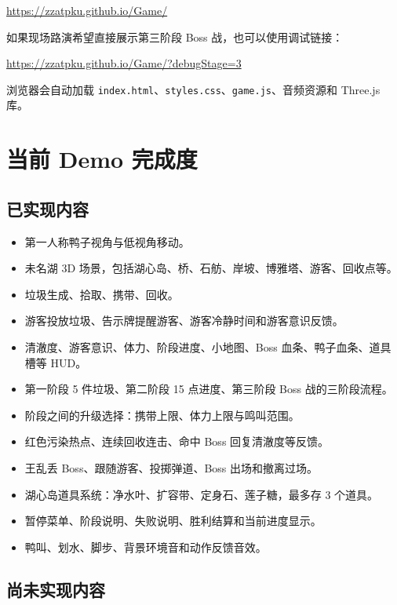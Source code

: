 \documentclass[UTF8,a4paper,12pt]{ctexart}
\begin{document}
\begin{center}
\url{https://zzatpku.github.io/Game/}
\end{center}

如果现场路演希望直接展示第三阶段 Boss 战，也可以使用调试链接：

\begin{center}
\url{https://zzatpku.github.io/Game/?debugStage=3}
\end{center}

浏览器会自动加载 \texttt{index.html}、\texttt{styles.css}、\texttt{game.js}、音频资源和 Three.js 库。

\section{当前 Demo 完成度}

\subsection{已实现内容}

\begin{itemize}
  \item 第一人称鸭子视角与低视角移动。
  \item 未名湖 3D 场景，包括湖心岛、桥、石舫、岸坡、博雅塔、游客、回收点等。
  \item 垃圾生成、拾取、携带、回收。
  \item 游客投放垃圾、告示牌提醒游客、游客冷静时间和游客意识反馈。
  \item 清澈度、游客意识、体力、阶段进度、小地图、Boss 血条、鸭子血条、道具槽等 HUD。
  \item 第一阶段 5 件垃圾、第二阶段 15 点进度、第三阶段 Boss 战的三阶段流程。
  \item 阶段之间的升级选择：携带上限、体力上限与鸣叫范围。
  \item 红色污染热点、连续回收连击、命中 Boss 回复清澈度等反馈。
  \item 王乱丢 Boss、跟随游客、投掷弹道、Boss 出场和撤离过场。
  \item 湖心岛道具系统：净水叶、扩容带、定身石、莲子糖，最多存 3 个道具。
  \item 暂停菜单、阶段说明、失败说明、胜利结算和当前进度显示。
  \item 鸭叫、划水、脚步、背景环境音和动作反馈音效。
\end{itemize}

\subsection{尚未实现内容}
\end{document}

